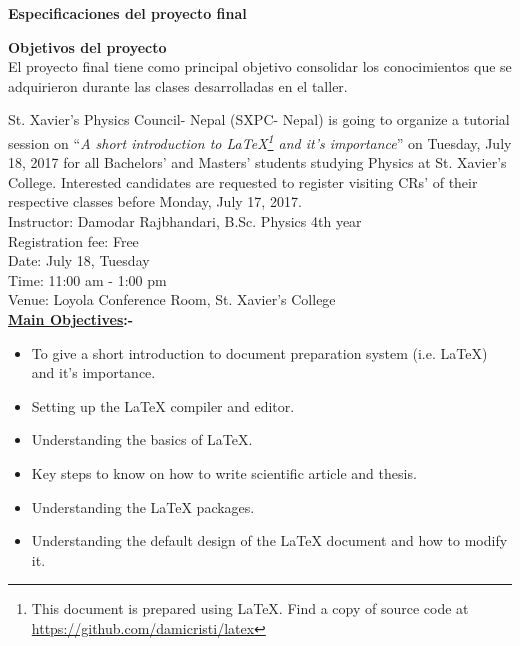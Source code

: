 \documentclass[a4paper,10pt]{article}
\begin{document}
\vspace*{2.1cm}

\begin{center}
\bfseries \LARGE Especificaciones del proyecto final
\end{center}

\vspace{0.1cm} 

\textbf{Objetivos del proyecto}\\

El proyecto final tiene como principal objetivo consolidar los conocimientos que se adquirieron durante las clases desarrolladas en el taller.

St. Xavier's Physics Council- Nepal (SXPC- Nepal) is going to organize a tutorial session on  \textquotedblleft \textit{A short introduction to \LaTeX\footnote{This document is prepared using \LaTeX. Find a copy of source code at \url{https://github.com/damicristi/latex}} and it's importance}\textquotedblright \hspace{0.01cm} on Tuesday, July 18, 2017 for all Bachelors' and Masters' students studying Physics at St. Xavier's College. Interested candidates are requested to register visiting CRs' of their respective classes before Monday, July 17, 2017. \\

Instructor: Damodar Rajbhandari, B.Sc. Physics 4th year\\
\hspace*{0.43cm} Registration fee: Free\\
\hspace*{0.43cm} Date: July 18, Tuesday\\
\hspace*{0.43cm}  Time: 11:00 am - 1:00 pm\\
\hspace*{0.43cm} Venue: Loyola Conference Room, St. Xavier's College\\


\textbf{\underline{Main Objectives}:-}
\begin{itemize}
\item To give a short introduction to document preparation system (i.e. \LaTeX) and it's importance.
\item Setting up the \LaTeX \hspace{0.01cm} compiler and editor.
\item Understanding the basics of \LaTeX.
\item Key steps to know on how to write scientific article and thesis.
\item Understanding the \LaTeX \hspace{0.01cm} packages.
\item Understanding the default design of the \LaTeX \hspace{0.01cm} document and how to modify it.  
\end{itemize}
\end{document}
